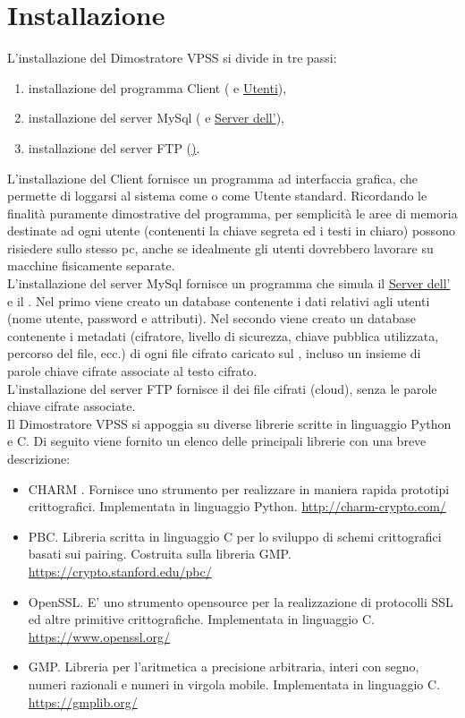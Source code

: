 \documentclass[a4paper,twoside,10pt,openany]{scrbook}
\begin{document}
\chapter{Installazione}\label{sec:installazione}
%
L'installazione del Dimostratore VPSS si divide in tre passi:
\begin{enumerate}
 \item installazione del programma Client (\hyperref[sec:authority]{\auth} e \hyperref[sec:users]{Utenti}),
 \item installazione del server MySql (\hyperref[sec:search_server]{\sr} e \hyperref[sec:auth_server]{Server dell'\auth}),
 \item installazione del server FTP (\hyperref[sec:cloud_server]{\sa)}.
\end{enumerate}
%
L'installazione del Client fornisce un programma ad interfaccia grafica, che permette di loggarsi al sistema come \auth o come Utente standard. Ricordando le finalità puramente dimostrative del programma, per semplicità le aree di memoria destinate ad ogni utente (contenenti la chiave segreta ed i testi in chiaro) possono risiedere sullo stesso pc, anche se  idealmente gli utenti dovrebbero lavorare su macchine fisicamente separate. \\
L'installazione del server MySql fornisce un programma che simula il \hyperref[sec:auth_server]{Server dell'\auth} e il \hyperref[sec:search_server]{\sr}. 
Nel primo viene creato un database contenente i dati relativi agli utenti (nome utente, password e attributi). 
Nel secondo viene creato un database contenente i metadati (cifratore, livello di sicurezza, chiave pubblica utilizzata, percorso del file, ecc.) di ogni file cifrato caricato sul \sa, incluso un insieme di parole chiave cifrate associate al testo cifrato.\\
L'installazione del server FTP fornisce il \hyperref[sec:cloud_server]{\sa} dei file cifrati (cloud), senza le parole chiave cifrate associate.\\
%
\indent
Il Dimostratore VPSS si appoggia su diverse librerie scritte in linguaggio Python e C. Di seguito viene fornito un elenco delle principali librerie con una breve descrizione:
\begin{itemize}
 \item CHARM \cite{charm13}. Fornisce uno strumento per realizzare in maniera rapida prototipi crittografici. Implementata in linguaggio Python. \url{http://charm-crypto.com/}
 \item PBC. Libreria scritta in linguaggio C per lo sviluppo di schemi crittografici basati sui pairing. Costruita sulla libreria GMP. \url{https://crypto.stanford.edu/pbc/}
 \item OpenSSL. E' uno strumento opensource per la realizzazione di protocolli SSL ed altre primitive crittografiche. Implementata in linguaggio C. \url{https://www.openssl.org/}
 \item GMP. Libreria per l'aritmetica a precisione arbitraria, interi con segno, numeri razionali e numeri in virgola mobile. Implementata in linguaggio C. \url{https://gmplib.org/}
\end{itemize}
\end{document}
